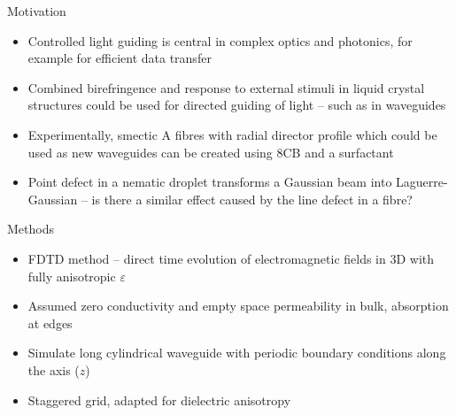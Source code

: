 \documentclass[8pt]{beamer}
\newlength{\wideitemsep}
\let\olditem\item
\renewcommand{\item}{\setlength{\itemsep}{\wideitemsep}\olditem}
\newcommand{\blockpadding}{
  \rule[-0.6ex]{0pt}{2.5ex}
}
\begin{document}
\begin{columns}[t]
 \begin{column}{.36\textwidth}
\begin{block}{\blockpadding Motivation}
\begin{itemize}
 \item Controlled light guiding is central in complex optics and photonics, for example for efficient data transfer
 \item Combined birefringence and response to external stimuli in liquid crystal structures could be used for directed guiding of light -- such as in waveguides\citep{lasers}
 \item Experimentally, smectic A fibres with radial director profile which could be used as new waveguides can be created using 8CB and a surfactant
 \item Point defect in a nematic droplet transforms a Gaussian beam into Laguerre-Gaussian\citep{brasselet} -- is there a similar effect caused by the line defect in a fibre?
\end{itemize}
\end{block}

\begin{block}{\blockpadding Methods}
 \begin{itemize}
  \item FDTD method\citep{taflove} -- direct time evolution of electromagnetic fields in 3D with fully anisotropic $\varepsilon$
  \item Assumed zero conductivity and empty space permeability in bulk, absorption at edges
  \item Simulate long cylindrical waveguide with periodic boundary conditions along the axis ($z$)
  \item Staggered grid, adapted for dielectric anisotropy
  \begin{figure}[h]
\centering
\end{figure}
\end{itemize}
\end{block}
\end{column}
\end{columns}
\end{document}
